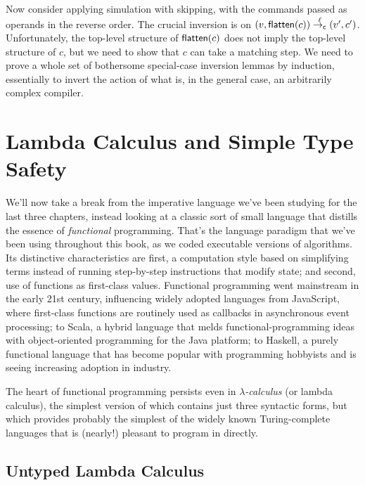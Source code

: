 \documentclass{amsbook}
\theoremstyle{definition}
\theoremstyle{remark}
\numberwithin{section}{chapter}
\numberwithin{equation}{chapter}
\begin{document}
Now consider applying simulation with skipping, with the commands passed as operands in the reverse order.
The crucial inversion is on $(v, \mathsf{flatten}(c)) \stackrel{\ell}{\to_\mathsf{c}} (v', c')$.
Unfortunately, the top-level structure of $\mathsf{flatten}(c)$ does not imply the top-level structure of $c$, but we need to show that $c$ can take a matching step.
We need to prove a whole set of bothersome special-case inversion lemmas by induction, essentially to invert the action of what is, in the general case, an arbitrarily complex compiler.



\chapter{Lambda Calculus and Simple Type Safety}

We'll now take a break from the imperative language we've been studying for the last three chapters, instead looking at a classic sort of small language that distills the essence of \emph{functional} programming.
That's the language paradigm that we've been using throughout this book, as we coded executable versions of algorithms.
Its distinctive characteristics are first, a computation style based on simplifying terms instead of running step-by-step instructions that modify state; and second, use of functions as first-class values.
Functional programming went mainstream in the early 21st century, influencing widely adopted languages from JavaScript, where first-class functions are routinely used as callbacks in asynchronous event processing; to Scala, a hybrid language that melds functional-programming ideas with object-oriented programming for the Java platform; to Haskell, a purely functional language that has become popular with programming hobbyists and is seeing increasing adoption in industry.

The heart of functional programming persists even in \emph{$\lambda$-calculus} (or lambda calculus), the simplest version of which contains just three syntactic forms, but which provides probably the simplest of the widely known Turing-complete languages that is (nearly!) pleasant to program in directly.


\section{Untyped Lambda Calculus}
\end{document}
